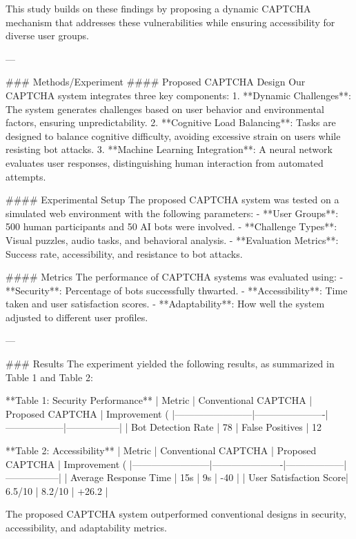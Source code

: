 This study builds on these findings by proposing a dynamic CAPTCHA mechanism that addresses these vulnerabilities while ensuring accessibility for diverse user groups.

---

### Methods/Experiment  
#### Proposed CAPTCHA Design  
Our CAPTCHA system integrates three key components:  
1. **Dynamic Challenges**: The system generates challenges based on user behavior and environmental factors, ensuring unpredictability.  
2. **Cognitive Load Balancing**: Tasks are designed to balance cognitive difficulty, avoiding excessive strain on users while resisting bot attacks.  
3. **Machine Learning Integration**: A neural network evaluates user responses, distinguishing human interaction from automated attempts.

#### Experimental Setup  
The proposed CAPTCHA system was tested on a simulated web environment with the following parameters:  
- **User Groups**: 500 human participants and 50 AI bots were involved.  
- **Challenge Types**: Visual puzzles, audio tasks, and behavioral analysis.  
- **Evaluation Metrics**: Success rate, accessibility, and resistance to bot attacks.  

#### Metrics  
The performance of CAPTCHA systems was evaluated using:  
- **Security**: Percentage of bots successfully thwarted.  
- **Accessibility**: Time taken and user satisfaction scores.  
- **Adaptability**: How well the system adjusted to different user profiles.

---

### Results  
The experiment yielded the following results, as summarized in Table 1 and Table 2:  

**Table 1: Security Performance**  
| Metric                 | Conventional CAPTCHA | Proposed CAPTCHA | Improvement (%
|------------------------|----------------------|------------------|-----------------|
| Bot Detection Rate     | 78%
| False Positives        | 12%

**Table 2: Accessibility**  
| Metric                 | Conventional CAPTCHA | Proposed CAPTCHA | Improvement (%
|------------------------|----------------------|------------------|-----------------|
| Average Response Time  | 15s                 | 9s               | -40             |
| User Satisfaction Score| 6.5/10              | 8.2/10           | +26.2           |

The proposed CAPTCHA system outperformed conventional designs in security, accessibility, and adaptability metrics.

